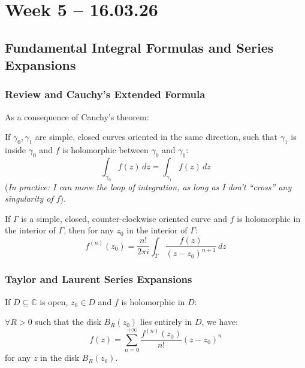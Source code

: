 \section{Week 5 -- 16.03.26}

\subsection{Fundamental Integral Formulas and Series Expansions}

\subsubsection{Review and Cauchy's Extended Formula}

\begin{recall}
    As a consequence of Cauchy's theorem:

    If $\gamma_0, \gamma_1$ are simple, closed curves oriented in the same direction, such that $\gamma_1$ is inside $\gamma_0$ and $f$ is holomorphic between $\gamma_0$ and $\gamma_1$:
    \[
        \int_{\gamma_0} f(z) \, dz = \int_{\gamma_1} f(z) \, dz
    \]
    (\textit{In practice: I can move the loop of integration, as long as I don't ``cross'' any singularity of $f$}).
\end{recall}

\begin{theorem}
    If $\Gamma$ is a simple, closed, counter-clockwise oriented curve and $f$ is holomorphic in the interior of $\Gamma$, then for any $z_0$ in the interior of $\Gamma$:
    \[
        f^{(n)}(z_0) = \frac{n!}{2\pi i} \int_{\Gamma} \frac{f(z)}{(z-z_0)^{n+1}} \, dz
    \]
\end{theorem}

\subsubsection{Taylor and Laurent Series Expansions}

\begin{theorem}
    If $D \subseteq \mathbb{C}$ is open, $z_0 \in D$ and $f$ is holomorphic in $D$: 
    
    $\forall R > 0$ such that the disk $B_R(z_0)$ lies entirely in $D$, we have:
    \[
        f(z) = \sum_{n=0}^{+\infty} \frac{f^{(n)}(z_0)}{n!} (z-z_0)^n
    \]
    for any $z$ in the disk $B_R(z_0)$.
\end{theorem}

